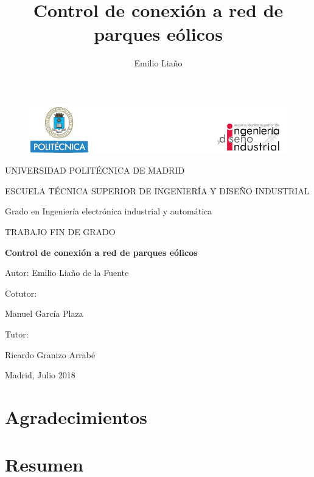 \documentclass{book}
\title{Control de conexi\'on a red de parques e\'olicos}
\date{}
\author{Emilio Lia\~no}
\begin{document}
\begin{figure}[h!]
\centering
\includegraphics[width=\textwidth]{Encabezado.PNG}
\end{figure}
\begin{center}
	\LARGE
	UNIVERSIDAD POLIT\'ECNICA DE MADRID \par
	\vspace {10 mm}
	ESCUELA T\'ECNICA SUPERIOR DE INGENIER\'IA Y DISEÑO INDUSTRIAL\par
	\vspace {10 mm}
	\LARGE
	Grado en Ingenier\'ia electr\'onica industrial y autom\'atica \par
	\vspace {10 mm}
	\Huge
	TRABAJO FIN DE GRADO \par
	\vspace{20 mm}
	\LARGE
	\textbf{Control de conexi\'on a red de parques e\'olicos}\par
	\vspace {10 mm}
	Autor: Emilio Liaño de la Fuente \par
	\vspace {10 mm}
\end{center}
\begin{multicols}{2}
	\LARGE
	Cotutor:

	Manuel Garc\'ia Plaza \par
	Tutor:

	Ricardo Granizo Arrab\'e
\vfill
		
\end{multicols}

\begin{flushright}
\vfill
	Madrid, Julio 2018
\end{flushright}
\afterpage{\null\newpage}
\newpage
\normalsize
{}

\chapter*{Agradecimientos}

\chapter*{Resumen}
\end{document}
